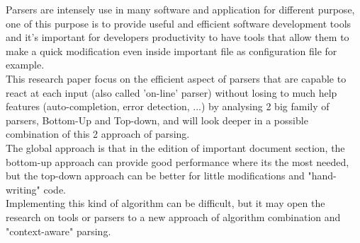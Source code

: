 Parsers are intensely use in many software and application for different purpose, one of this purpose is to provide useful and efficient software development tools and it's important for developers productivity to have tools that allow them to make a quick modification even inside important file as configuration file for example.\\
This research paper focus on the efficient aspect of parsers that are capable to react at each input (also called 'on-line' parser) without losing to much help features (auto-completion, error detection, ...) by analysing 2 big family of parsers, Bottom-Up and Top-down, and will look deeper in a possible combination of this 2 approach of parsing.\\
The global approach is that in the edition of important document section, the bottom-up approach can provide good performance where its the most needed, but the top-down approach can be better for little modifications and "hand-writing" code.\\
Implementing this kind of algorithm can be difficult, but it may open the research on tools or parsers to a new approach of algorithm combination and "context-aware" parsing.